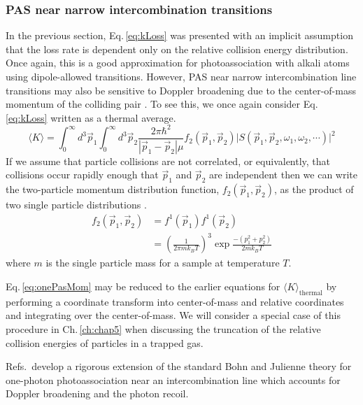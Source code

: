 \subsubsection{PAS near narrow intercombination transitions} \label{sssec:narrow_pa}
In the previous section, Eq.\,\ref{eq:kLoss} was presented with an implicit assumption that the loss rate is dependent only on the relative collision energy distribution.
Once again, this is a good approximation for photoassociation with alkali atoms using dipole-allowed transitions.
However, PAS near narrow intercombination line transitions may also be sensitive to Doppler broadening due to the center-of-mass momentum of the colliding pair \cite{Ciuryo2004,Reschovsky,Borkowski2014a}.
To see this, we once again consider Eq.\,\ref{eq:kLoss} written as a thermal average.
\begin{equation} \label{eq:onePasMom}
	 \langle K \rangle = \int_0^{\infty} d^3\vec{p}_1 \int_0^{\infty} d^3\vec{p}_2 \frac{2 \pi \hbar^2}{|\vec{p}_1 - \vec{p}_2| \mu} f_2( \vec{p}_1, \vec{p}_2 ) \vert S(\vec{p}_1, \vec{p}_2, \omega_1, \omega_2, \cdots) \vert^2  
\end{equation}
If we assume that particle collisions are not correlated, or equivalently, that collisions occur rapidly enough that $\vec{p}_1$ and $\vec{p}_2$ are independent then we can write the two-particle momentum distribution function, $f_2( \vec{p}_1, \vec{p}_2 )$, as the product of two single particle distributions \cite{Ehrenfest2015,Chliamovitch2017,Brown2008}. 
\begin{equation} \label{eq:3two_particle_prob}
\begin{split}
		 f_2( \vec{p}_1, \vec{p}_2 ) &= f^1( \vec{p}_1 ) f^1( \vec{p}_2 ) \\
		  &= \left(\frac{1}{2 \pi m k_B T}\right)^3 \exp{\frac{-(p_1^2 + p_2^2)}{2 m k_B T}}
\end{split}
\end{equation}
where $m$ is the single particle mass for a sample at temperature $T$.

Eq.\,\ref{eq:onePasMom} may be reduced to the earlier equations for $\langle K \rangle_\text{thermal}$ by performing a coordinate transform into center-of-mass and relative coordinates and integrating over the center-of-mass.
We will consider a special case of this procedure in Ch.\,\ref{ch:chap5} when discussing the truncation of the relative collision energies of particles in a trapped gas.

Refs.\,\cite{Ciuryo2004, Borkowski2014a} develop a rigorous extension of the standard Bohn and Julienne theory for one-photon photoassociation near an intercombination line which accounts for Doppler broadening and the photon recoil.



